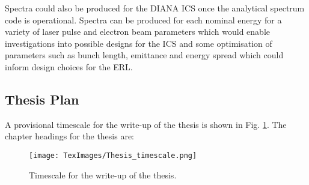 \documentclass[10pt]{article}
\begin{document}
Spectra could also be produced for the DIANA ICS once the analytical spectrum code is operational. Spectra can be produced for each nominal energy for a variety of laser pulse and electron beam parameters which would enable investigations into possible designs for the ICS and some optimisation of parameters such as bunch length, emittance and energy spread which could inform design choices for the ERL.  

\subsection*{Thesis Plan}

A provisional timescale for the write-up of the thesis is shown in Fig. \ref{fig:timescale}. The chapter headings for the thesis are:

\begin{outline}
\end{outline}

\begin{figure}
\texttt{[image: TexImages/Thesis\_timescale.png]}
\caption{Timescale for the write-up of the thesis.}
\label{fig:timescale}
\end{figure}



\end{document}
